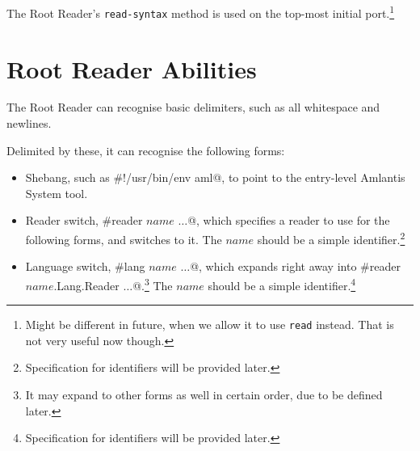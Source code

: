 The Root Reader's \lstinline!read-syntax! method is used on the top-most initial port.\footnote{Might be different in future, when we allow it to use \lstinline!read! instead. That is not very useful now though.}




\newpage

\section{Root Reader Abilities}

The Root Reader can recognise basic delimiters, such as all whitespace and newlines. 

Delimited by these, it can recognise the following forms:

\begin{itemize}
  \item Shebang, such as \lstinline@#!/usr/bin/env aml@, to point to the entry-level Amlantis System tool.
  \item Reader switch, \lstinline@#reader $name$ $\ldots$@, which specifies a reader to use for the following forms, and switches to it. The $name$ should be a simple identifier.\footnote{Specification for identifiers will be provided later.}
  \item Language switch, \lstinline@#lang $name$ $\ldots$@, which expands right away into \lstinline@#reader $name$.Lang.Reader $\ldots$@.\footnote{It may expand to other forms as well in certain order, due to be defined later.} The $name$ should be a simple identifier.\footnote{Specification for identifiers will be provided later.}
\end{itemize}






